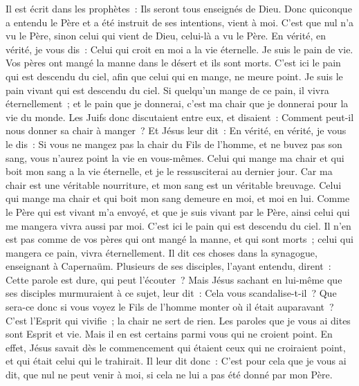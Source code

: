 \begin{multicols}{2}
Il est écrit dans les prophètes~: Ils seront tous enseignés de Dieu. Donc quiconque a entendu le Père et a été instruit de ses intentions, vient à moi.
C'est que nul n'a vu le Père, sinon celui qui vient de Dieu, celui-là a vu le Père.
En vérité, en vérité, je vous dis~: Celui qui croit en moi a la vie éternelle.
Je suis le pain de vie.
Vos pères ont mangé la manne dans le désert et ils sont morts.
C'est ici le pain qui est descendu du ciel, afin que celui qui en mange, ne meure point.
Je suis le pain vivant qui est descendu du ciel. Si quelqu'un mange de ce pain, il vivra éternellement~; et le pain que je donnerai, c'est ma chair que je donnerai pour la vie du monde.
Les Juifs donc discutaient entre eux, et disaient~: Comment peut-il nous donner sa chair à manger~?
Et Jésus leur dit~: En vérité, en vérité, je vous le dis~: Si vous ne mangez pas la chair du Fils de l'homme, et ne buvez pas son sang, vous n'aurez point la vie en vous-mêmes.
Celui qui mange ma chair et qui boit mon sang a la vie éternelle, et je le ressusciterai au dernier jour.
Car ma chair est une véritable nourriture, et mon sang est un véritable breuvage.
Celui qui mange ma chair et qui boit mon sang demeure en moi, et moi en lui.
Comme le Père qui est vivant m'a envoyé, et que je suis vivant par le Père, ainsi celui qui me mangera vivra aussi par moi.
C'est ici le pain qui est descendu du ciel. Il n'en est pas comme de vos pères qui ont mangé la manne, et qui sont morts~; celui qui mangera ce pain, vivra éternellement.
Il dit ces choses dans la synagogue, enseignant à Capernaüm.
Plusieurs de ses disciples, l'ayant entendu, dirent~: Cette parole est dure, qui peut l'écouter~?
Mais Jésus sachant en lui-même que ses disciples murmuraient à ce sujet, leur dit~: Cela vous scandalise-t-il~?
Que sera-ce donc si vous voyez le Fils de l'homme monter où il était auparavant~?
C'est l'Esprit qui vivifie~; la chair ne sert de rien. Les paroles que je vous ai dites sont Esprit et vie.
Mais il en est certains parmi vous qui ne croient point. En effet, Jésus savait dès le commencement qui étaient ceux qui ne croiraient point, et qui était celui qui le trahirait.
Il leur dit donc~: C'est pour cela que je vous ai dit, que nul ne peut venir à moi, si cela ne lui a pas été donné par mon Père.

\end{multicols}
